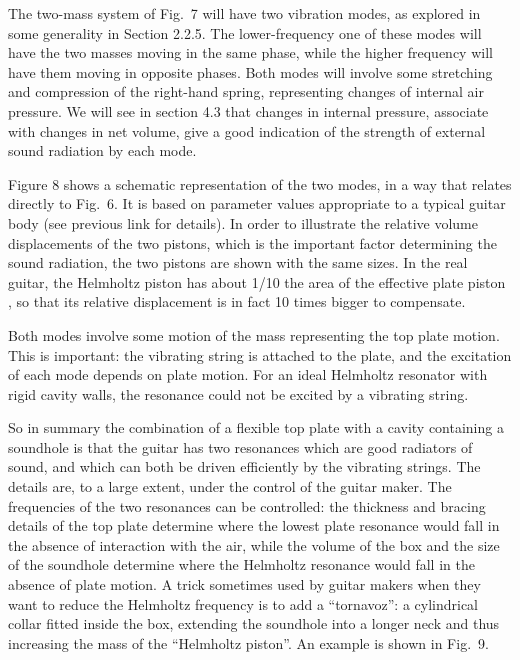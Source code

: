   The two-mass system of Fig.\ 7 will have two vibration modes, as explored in 
  some generality in Section 2.2.5. The lower-frequency one of these modes will 
  have the two masses moving in the same phase, while the higher frequency will 
  have them moving in opposite phases. Both modes will involve some stretching 
  and compression of the right-hand spring, representing changes of internal 
  air pressure. We will see in section 4.3 that changes in internal pressure, 
  associate with changes in net volume, give a good indication of the strength 
  of external sound radiation by each mode. 

  Figure 8 shows a schematic representation of the two modes, in a way that 
  relates directly to Fig.\ 6. It is based on parameter values appropriate to a 
  typical guitar body (see previous link for details). In order to illustrate 
  the relative volume displacements of the two pistons, which is the important 
  factor determining the sound radiation, the two pistons are shown with the 
  same sizes. In the real guitar, the Helmholtz piston has about 1/10 the area 
  of the effective plate piston , so that its relative displacement is in fact 
  10 times bigger to compensate. 

  Both modes involve some motion of the mass representing the top plate motion. 
  This is important: the vibrating string is attached to the plate, and the 
  excitation of each mode depends on plate motion. For an ideal Helmholtz 
  resonator with rigid cavity walls, the resonance could not be excited by a 
  vibrating string. 

  So in summary the combination of a flexible top plate with a cavity 
  containing a soundhole is that the guitar has two resonances which are good 
  radiators of sound, and which can both be driven efficiently by the vibrating 
  strings. The details are, to a large extent, under the control of the guitar 
  maker. The frequencies of the two resonances can be controlled: the thickness 
  and bracing details of the top plate determine where the lowest plate 
  resonance would fall in the absence of interaction with the air, while the 
  volume of the box and the size of the soundhole determine where the Helmholtz 
  resonance would fall in the absence of plate motion. A trick sometimes used 
  by guitar makers when they want to reduce the Helmholtz frequency is to add a 
  ``tornavoz'': a cylindrical collar fitted inside the box, extending the 
  soundhole into a longer neck and thus increasing the mass of the ``Helmholtz 
  piston''. An example is shown in Fig.\ 9. 

